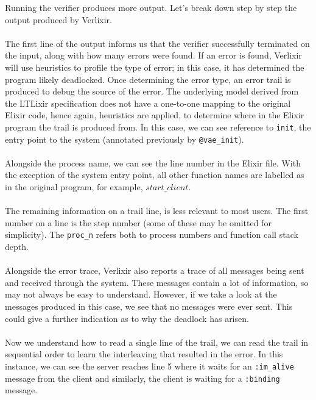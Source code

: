 Running the verifier produces more output. Let's break down step by step the output produced by Verlixir. 
\\ \\
The first line of the output informs us that the verifier successfully terminated on the input, along with how many errors were found. If an error is found, Verlixir will use heuristics to profile the type of error; in this case, it has determined the program likely deadlocked. Once determining the error type, an error trail is produced to debug the source of the error. The underlying model derived from the LTLixir specification does not have a one-to-one mapping to the original Elixir code, hence again, heuristics are applied, to determine where in the Elixir program the trail is produced from. In this case, we can see reference to \texttt{init}, the entry point to the system (annotated previously by \texttt{@vae\_init}).
\\ \\
Alongside the process name, we can see the line number in the Elixir file. With the exception of the system entry point, all other function names are labelled as in the original program, for example, $start\_client$.
\\ \\
The remaining information on a trail line, is less relevant to most users. The first number on a line is the step number (some of these may be omitted for simplicity). The \texttt{proc\_n} refers both to process numbers and function call stack depth.
\\ \\
Alongside the error trace, Verlixir also reports a trace of all messages being sent and received through the system. These messages contain a lot of information, so may not always be easy to understand. However, if we take a look at the messages produced in this case, we see that no messages were ever sent. This could give a further indication as to why the deadlock has arisen.
\\ \\
Now we understand how to read a single line of the trail, we can read the trail in sequential order to learn the interleaving that resulted in the error. In this instance, we can see the server reaches line 5 where it waits for an \texttt{:im\_alive} message from the client and similarly, the client is waiting for a \texttt{:binding} message.
